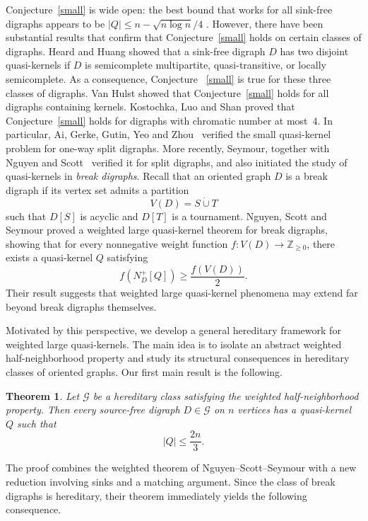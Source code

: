 \documentclass[11pt,a4paper]{article}
\newtheorem{theorem}{Theorem}[section]
\begin{document}
Conjecture~\ref{small} is wide open: the best bound that works for all sink-free digraphs appears to be $|Q|\le n-\sqrt{n\log n}/4$ \cite{Spiro}. However, there have been substantial results that confirm that Conjecture~\ref{small} holds on certain classes of digraphs. 
Heard and Huang \cite{heard2008disjoint}  showed that a sink-free digraph $D$ has two disjoint quasi-kernels if $D$ is semicomplete multipartite, quasi-transitive, or locally semicomplete. As a consequence, Conjecture ~\ref{small} is true for these three classes of digraphs. Van Hulst \cite{Hulst2021KernelsAS} showed that Conjecture~\ref{small} holds for all digraphs containing kernels. Kostochka, Luo and Shan \cite{MR4477848} proved that Conjecture~\ref{small} holds for digraphs with chromatic number at most~4. In particular, Ai, Gerke, Gutin, Yeo and Zhou~\cite{AGGYZ}
verified the small quasi-kernel problem for one-way split
digraphs. More recently, Seymour, together with Nguyen and Scott~\cite{NSS} verified it for split digraphs, and also initiated
the study of quasi-kernels in \emph{break digraphs}. Recall that an
oriented graph \(D\) is a break digraph if its vertex set admits a partition
\[
V(D)=S\dot\cup T
\]
such that \(D[S]\) is acyclic and \(D[T]\) is a tournament.
Nguyen, Scott and Seymour proved a weighted large quasi-kernel theorem for
break digraphs, showing that for every nonnegative weight function
\(f:V(D)\to\mathbb Z_{\ge0}\), there exists a quasi-kernel \(Q\) satisfying
\[
f(N_D^+[Q])\ge \frac{f(V(D))}{2}.
\]
Their result suggests that weighted large quasi-kernel phenomena may extend far
beyond break digraphs themselves.

Motivated by this perspective, we develop a general hereditary framework for
weighted large quasi-kernels. The main idea is to isolate an abstract weighted
half-neighborhood property and study its structural consequences in hereditary
classes of oriented graphs. Our first main result is the following.

\begin{theorem}
Let \(\mathcal G\) be a hereditary class satisfying the weighted
half-neighborhood property. Then every source-free digraph
\(D\in\mathcal G\) on \(n\) vertices has a quasi-kernel \(Q\) such that
\[
|Q|\le \frac{2n}{3}.
\]
\end{theorem}

The proof combines the weighted theorem of Nguyen--Scott--Seymour with a new
reduction involving sinks and a matching argument. Since the class of break
digraphs is hereditary, their theorem immediately yields the following
consequence.
\end{document}
